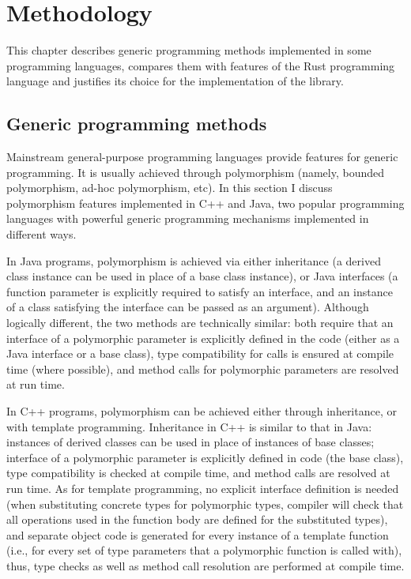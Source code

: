 \chapter{Methodology}
\label{chap:met}

This chapter describes generic programming methods implemented in some programming languages,
compares them with features of the Rust programming language and justifies its choice for
the implementation of the library.

\section{Generic programming methods}


Mainstream general-purpose programming languages provide features for generic programming. It is
usually achieved through polymorphism (namely, bounded polymorphism, ad-hoc polymorphism, etc).
In this section I discuss polymorphism features implemented in C++ and Java, two popular
programming languages with powerful generic programming mechanisms implemented in different ways.

In Java programs, polymorphism is achieved via either inheritance (a derived class instance
can be used in place of a base class instance), or
Java interfaces (a function parameter is explicitly required to satisfy an interface, and an
instance of a class satisfying the interface can be passed as an argument).
Although logically different, the two methods are technically similar: both require that
an interface of a polymorphic parameter is explicitly defined in the code (either as a
Java interface or a base class), type compatibility for calls is ensured at compile time
(where possible), and method calls for polymorphic parameters are resolved at run time.

In C++ programs, polymorphism can be achieved either through inheritance, or with template
programming. Inheritance in C++ is similar to that in Java: instances of derived classes can
be used in place of instances of base classes; interface of a polymorphic parameter is
explicitly defined in code (the base class), type compatibility is checked
at compile time, and method calls are resolved at run time. As for template programming,
no explicit interface definition is needed (when substituting concrete types for polymorphic
types, compiler will check that all operations used in the function body are defined for
the substituted types), and separate object code is generated for every instance of
a template function (i.e., for every set of type parameters that a polymorphic function is
called with), thus, type checks as well as method call resolution are performed at compile time.

